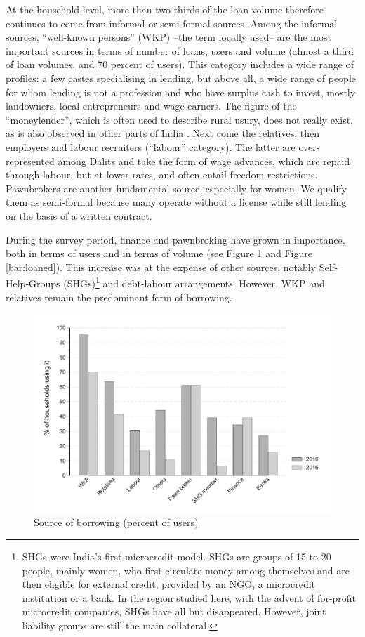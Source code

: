 \documentclass[a4paper, 11pt, onecolumn]{article}
\begin{document}
At the household level, more than two-thirds of the loan volume therefore continues to come from informal or semi-formal sources. 
Among the informal sources, ``well-known persons'' (WKP) --the term locally used-- are the most important sources in terms of number of loans, users and volume (almost a third of loan volumes, and 70 percent of users). 
This category includes a wide range of profiles: a few castes specialising in lending, but above all, a wide range of people for whom lending is not a profession and who have surplus cash to invest, mostly landowners, local entrepreneurs and wage earners. 
The figure of the ``moneylender'', which is often used to describe rural usury, does not really exist, as is also observed in other parts of India \citep{Gregory1997}. 
Next come the relatives, then employers and labour recruiters (``labour'' category). 
The latter are over-represented among Dalits and take the form of wage advances, which are repaid through labour, but at lower rates, and often entail freedom restrictions. 
Pawnbrokers are another fundamental source, especially for women. 
We qualify them as semi-formal because many operate without a license while still lending on the basis of a written contract. 

During the survey period, finance and pawnbroking have grown in importance, both in terms of users and in terms of volume (see Figure \ref{bar:clientele} and Figure \ref{bar:loaned}). 
This increase was at the expense of other sources, notably Self-Help-Groups (SHGs)\footnote{SHGs were India's first microcredit model. SHGs are groups of 15 to 20 people, mainly women, who first circulate money among themselves and are then eligible for external credit, provided by an NGO, a microcredit institution or a bank. In the region studied here, with the advent of for-profit microcredit companies, SHGs have all but disappeared. However, joint liability groups are still the main collateral.}  and debt-labour arrangements. 
However, WKP and relatives remain the predominant form of borrowing.

\begin{figure}[ht]
\center
\includegraphics[width=12cm]{totalclientele.pdf}
\caption{Source of borrowing (percent of users)}
\label{bar:clientele}
\end{figure}
\end{document}
